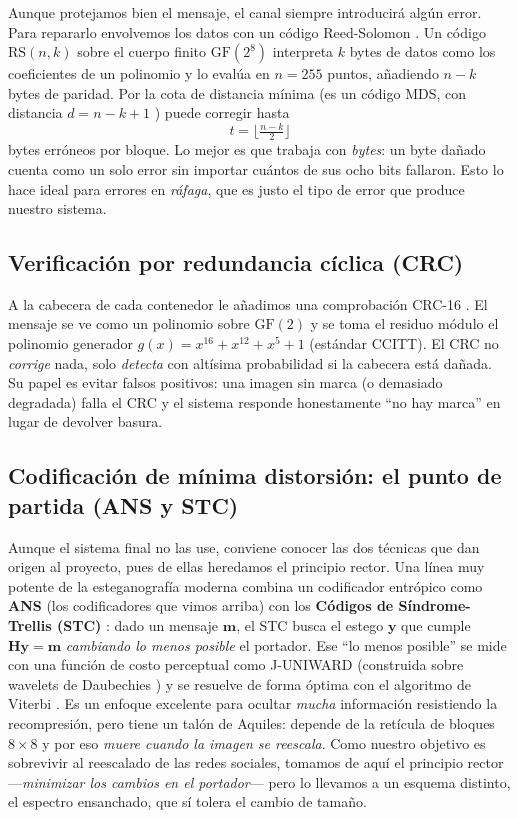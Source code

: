\documentclass[12pt,a4paper]{article}
\renewcommand{\nobreakdash}{}
\newcommand{\vect}[1]{\mathbf{#1}}
\begin{document}
Aunque protejamos bien el mensaje, el canal siempre introducirá algún error. Para repararlo
envolvemos los datos con un código Reed\nobreakdash-Solomon \cite{reedsolomon1960}. Un
código $\mathrm{RS}(n,k)$ sobre el cuerpo finito $\mathrm{GF}(2^8)$ interpreta $k$ bytes de
datos como los coeficientes de un polinomio y lo evalúa en $n=255$ puntos, añadiendo $n-k$
bytes de paridad. Por la cota de distancia mínima (es un código MDS, con distancia
$d=n-k+1$ \cite{macwilliams1977}) puede corregir hasta
\begin{equation}
t = \Big\lfloor \tfrac{n-k}{2} \Big\rfloor
\end{equation}
bytes erróneos por bloque. Lo mejor es que trabaja con \emph{bytes}: un byte dañado cuenta
como un solo error sin importar cuántos de sus ocho bits fallaron. Esto lo hace ideal para
errores en \emph{ráfaga}, que es justo el tipo de error que produce nuestro sistema.

\subsection{Verificación por redundancia cíclica (CRC)}

A la cabecera de cada contenedor le añadimos una comprobación CRC\nobreakdash-16
\cite{peterson1961}. El mensaje se ve como un polinomio sobre $\mathrm{GF}(2)$ y se toma el
residuo módulo el polinomio generador $g(x)=x^{16}+x^{12}+x^{5}+1$ (estándar CCITT). El CRC
no \emph{corrige} nada, solo \emph{detecta} con altísima probabilidad si la cabecera está
dañada. Su papel es evitar falsos positivos: una imagen sin marca (o demasiado degradada)
falla el CRC y el sistema responde honestamente ``no hay marca'' en lugar de devolver
basura.

\subsection{Codificación de mínima distorsión: el punto de partida (ANS y STC)}

Aunque el sistema final no las use, conviene conocer las dos técnicas que dan origen al
proyecto, pues de ellas heredamos el principio rector. Una línea muy potente de la
esteganografía moderna combina un codificador entrópico como \textbf{ANS} (los codificadores
que vimos arriba) con los \textbf{Códigos de Síndrome-Trellis (STC)} \cite{filler2011}: dado
un mensaje $\vect{m}$, el STC busca el estego $\vect{y}$ que cumple
$\vect{H}\vect{y}=\vect{m}$ \emph{cambiando lo menos posible} el portador. Ese ``lo menos
posible'' se mide con una función de costo perceptual como J-UNIWARD \cite{holub2014uniward}
(construida sobre wavelets de Daubechies \cite{daubechies1992}) y se resuelve de forma óptima
con el algoritmo de Viterbi \cite{viterbi1967}. Es un enfoque excelente para ocultar
\emph{mucha} información resistiendo la recompresión, pero tiene un talón de Aquiles: depende
de la retícula de bloques $8\times8$ y por eso \emph{muere cuando la imagen se reescala}. Como
nuestro objetivo es sobrevivir al reescalado de las redes sociales, tomamos de aquí el
principio rector ---\emph{minimizar los cambios en el portador}--- pero lo llevamos a un
esquema distinto, el espectro ensanchado, que sí tolera el cambio de tamaño.
\end{document}
